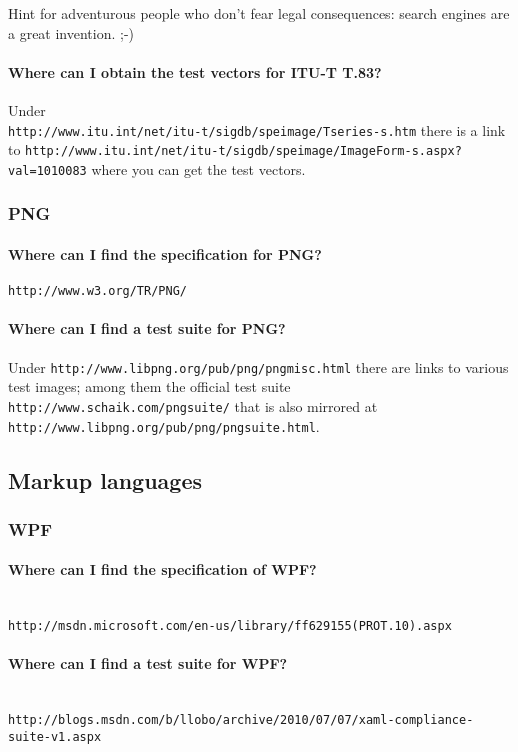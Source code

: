 \documentclass[10pt]{scrbook}
\begin{document}
Hint for adventurous people who don't fear legal consequences: search engines are a great invention. ;-)

\paragraph{Where can I obtain the test vectors for ITU-T T.83?} Under \\
\verb|http://www.itu.int/net/itu-t/sigdb/speimage/Tseries-s.htm|
there is a link to
\verb|http://www.itu.int/net/itu-t/sigdb/speimage/ImageForm-s.aspx?val=1010083|
where you can get the test vectors.

\subsubsection{PNG}

\paragraph{Where can I find the specification for PNG?} \verb|http://www.w3.org/TR/PNG/|

\paragraph{Where can I find a test suite for PNG?}

Under \verb|http://www.libpng.org/pub/png/pngmisc.html| there are links to various test images; among them the official test suite \verb|http://www.schaik.com/pngsuite/| that is also mirrored at \verb|http://www.libpng.org/pub/png/pngsuite.html|.

\subsection{Markup languages}

\subsubsection{WPF}

\paragraph{Where can I find the specification of WPF?} ~ \\
\verb|http://msdn.microsoft.com/en-us/library/ff629155(PROT.10).aspx|

\paragraph{Where can I find a test suite for WPF?} ~ \\
\verb|http://blogs.msdn.com/b/llobo/archive/2010/07/07/xaml-compliance-suite-v1.aspx|
\end{document}
